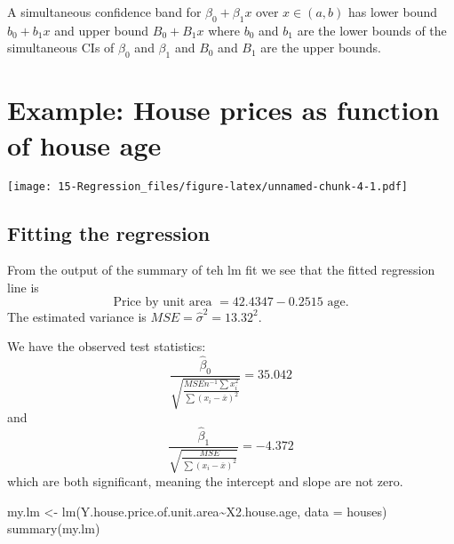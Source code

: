 \documentclass[
]{book}
\newenvironment{Shaded}{\begin{snugshade}}{\end{snugshade}}
\newcommand{\AttributeTok}[1]{\textcolor[rgb]{0.77,0.63,0.00}{#1}}
\newcommand{\ConstantTok}[1]{\textcolor[rgb]{0.00,0.00,0.00}{#1}}
\newcommand{\FunctionTok}[1]{\textcolor[rgb]{0.00,0.00,0.00}{#1}}
\newcommand{\NormalTok}[1]{#1}
\newcommand{\OtherTok}[1]{\textcolor[rgb]{0.56,0.35,0.01}{#1}}
\newcommand{\SpecialCharTok}[1]{\textcolor[rgb]{0.00,0.00,0.00}{#1}}
\newcommand{\StringTok}[1]{\textcolor[rgb]{0.31,0.60,0.02}{#1}}
\begin{document}
A simultaneous confidence band for \(\beta_0 + \beta_1 x\) over \(x \in (a,b)\) has lower bound \(b_0 + b_1 x\) and upper bound \(B_0 +B_1 x\) where \(b_0\) and \(b_1\) are the lower bounds of the simultaneous CIs of \(\beta_0\) and \(\beta_1\) and \(B_0\) and \(B_1\) are the upper bounds.

\hypertarget{example-house-prices-as-function-of-house-age}{%
\section{Example: House prices as function of house age}\label{example-house-prices-as-function-of-house-age}}

\begin{Shaded}
\end{Shaded}

\texttt{[image: 15-Regression\_files/figure-latex/unnamed-chunk-4-1.pdf]}

\hypertarget{fitting-the-regression}{%
\subsection{Fitting the regression}\label{fitting-the-regression}}

From the output of the summary of teh lm fit we see that the fitted regression line is
\[\text{Price by unit area } = 42.4347 - 0.2515\text{ age}. \]
The estimated variance is \(MSE = \hat\sigma^2 = 13.32^2\).

We have the observed test statistics:
\[\frac{\hat\beta_0}{\sqrt{\frac{MSE n^{-1}\sum x_i^2}{\sum(x_i - \overline x)^2}}} = 35.042\]
and
\[\frac{\hat\beta_1}{\sqrt{\frac{MSE }{\sum(x_i - \overline x)^2}}} = -4.372\]
which are both significant, meaning the intercept and slope are not zero.

\begin{Shaded}
\begin{Highlighting}[]
\NormalTok{my.lm }\OtherTok{\textless{}{-}} \FunctionTok{lm}\NormalTok{(Y.house.price.of.unit.area}\SpecialCharTok{\textasciitilde{}}\NormalTok{X2.house.age, }\AttributeTok{data =}\NormalTok{ houses)}
\FunctionTok{summary}\NormalTok{(my.lm)}
\end{Highlighting}
\end{Shaded}
\end{document}
